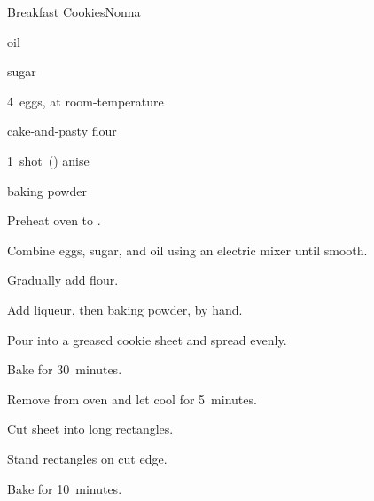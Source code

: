 \begin{recipe}{Breakfast Cookies}{Nonna}{}

\begin{ingredients}
\item {} oil
\item {} sugar
\item 4~eggs, at room-temperature
\item {} cake-and-pasty flour
\item 1~shot~(\oz{1\half}) anise 
\item {} baking powder
\end{ingredients}

\begin{directions}
\item Preheat oven to .
\item Combine eggs, sugar, and oil using an electric mixer until smooth.
\item Gradually add flour.
\item Add liqueur, then baking powder, by hand.
\item Pour into a greased cookie sheet and spread evenly.
\item Bake for 30~minutes.
\item Remove from oven and let cool for 5~minutes.
\item Cut sheet into long rectangles.
\item Stand rectangles on cut edge.
\item Bake for 10~minutes.
\end{directions}

\end{recipe}
